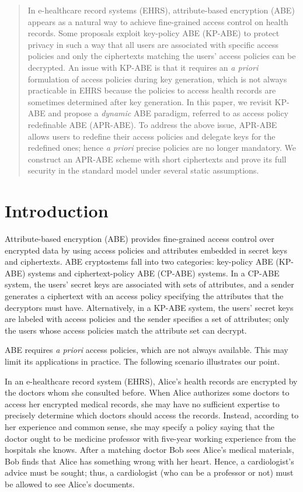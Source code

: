 \documentclass[twocolumn]{svjour3}          \smartqed  \usepackage{graphicx}
\begin{document}
\begin{abstract}
In e-healthcare record systems (EHRS), attribute-based encryption (ABE)
appears as a natural way to achieve fine-grained access control on health records. Some proposals exploit key-policy ABE (KP-ABE) to protect privacy in
such a way that all users are associated with specific access policies and only the ciphertexts matching the users' access policies can be decrypted.
An issue with KP-ABE is that it requires an {\em a priori} formulation
of access policies during key generation, which is not always practicable in EHRS because the policies to access health records are sometimes determined after key generation. In this paper, we  revisit KP-ABE and propose a {\em dynamic} ABE paradigm, referred to as access policy redefinable ABE (APR-ABE). To address the above issue,  APR-ABE allows users to redefine their access policies and delegate keys for the redefined ones; hence {\em a priori} precise policies are no longer mandatory. We construct an APR-ABE scheme with short ciphertexts and prove its full security in the standard model under several static assumptions.

\end{abstract}

\section{Introduction}
\label{intro}

Attribute-based encryption (ABE) provides fine-grained access control
over encrypted data by using access policies and attributes embedded in secret keys and
ciphertexts. ABE cryptostems \cite{SW05} fall into two categories:
key-policy ABE (KP-ABE) \cite{GPS+06} systems and ciphertext-policy ABE (CP-ABE)
\cite{BSW07} systems. In a CP-ABE system, the users' secret keys are associated with sets of attributes, and a sender generates a ciphertext with an access policy specifying the attributes that the decryptors must have. Alternatively, in a KP-ABE system, the users' secret keys are labeled with access policies and the sender specifies a set of attributes; only the users whose access policies match the attribute set can decrypt.

ABE requires \emph{a priori} access policies, which are not always available. This may limit its applications in practice. The following scenario
illustrates our point.

In an e-healthcare record system (EHRS),  Alice's health records are encrypted by the doctors whom she consulted before. When Alice authorizes some doctors to access her encrypted medical records, she may have no sufficient expertise to precisely determine which doctors should access the records. Instead, according to her
experience and common sense, she may specify a policy saying that the doctor
ought to be medicine professor with five-year working experience from the
hospitals she knows. After a matching doctor Bob sees Alice's medical materials, Bob finds that Alice has something wrong with her heart. Hence, a
cardiologist's advice must be sought; thus, a cardiologist (who can be a professor or not) must be allowed to see Alice's documents.
\end{document}

